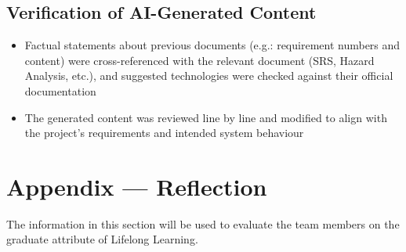 \documentclass[12pt, titlepage]{article}
\begin{document}
\subsection{Verification of AI-Generated Content}


\begin{itemize}
  \item Factual statements about previous documents (e.g.: requirement numbers and
  content) were cross-referenced with the relevant document (SRS, Hazard Analysis, etc.),
  and suggested technologies were checked against their official documentation
  \item The generated content was reviewed line by line and modified to align with
  the project's requirements and intended system behaviour
\end{itemize}

\newpage{}

\section{Appendix --- Reflection}


The information in this section will be used to evaluate the team members on the
graduate attribute of Lifelong Learning.


\end{document}
